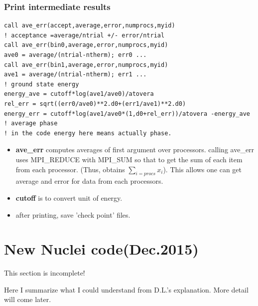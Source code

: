 \documentclass[10pt]{book}
\begin{document}
\subsection{Print intermediate results} 
\begin{lstlisting}[frame=single]
call ave_err(accept,average,error,numprocs,myid)
! acceptance =average/ntrial +/- error/ntrial
call ave_err(bin0,average,error,numprocs,myid)
ave0 = average/(ntrial-ntherm); err0 ...
call ave_err(bin1,average,error,numprocs,myid)
ave1 = average/(ntrial-ntherm); err1 ...
! ground state energy
energy_ave = cutoff*log(ave1/ave0)/atovera
rel_err = sqrt((err0/ave0)**2.d0+(err1/ave1)**2.d0)
energy_err = cutoff*log(ave1/ave0*(1,d0+rel_err))/atovera -energy_ave
! average phase 
! in the code energy here means actually phase.
\end{lstlisting}  
\begin{itemize}
\item {\bf ave\_err} computes averages of first argument over processors.
       calling ave\_err uses MPI\_REDUCE with MPI\_SUM so that 
       to get the sum of each item from each processor. 
       (Thus, obtains $\sum_{i=procs} x_i$). 
       This allows one can get average and error for data from each processors.
        
\item {\bf cutoff} is to convert unit of energy. 
\item after printing, save 'check point' files.
\end{itemize}

\newpage 

\chapter{New Nuclei code(Dec.2015) }
{\color{red} This section is incomplete!}

Here I summarize what I could understand from D.L.'s explanation.
More detail will come later.
\end{document}
